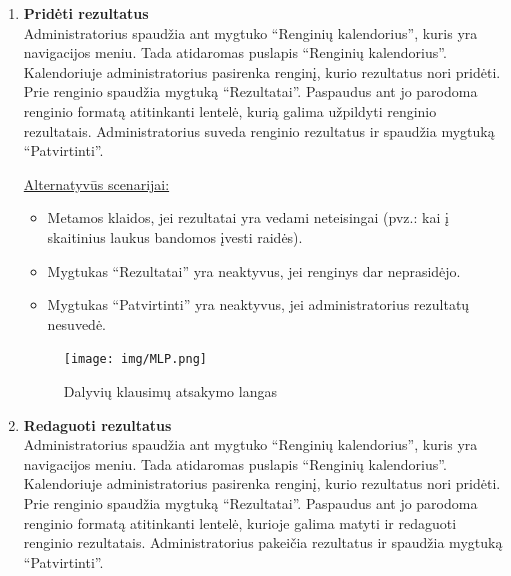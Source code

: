 \documentclass{VUMIFPSkursinis}
\begin{document}
\begin{enumerate} [label = \textbf{U\arabic*.}]
					\underline{Alternatyvūs scenarijai:}
					\begin{itemize}
						\item Jei administratorius atsiradus dialogui atšaukia ištrinimą, dialogas pašalinamas ir parodomas renginio puslapis.
					\end{itemize}
				
				\begin{figure}[H]
					\centering
					\texttt{[image: img/MLP.png]}
					\caption{Dalyvių klausimų atsakymo langas}
					\label{fig:atsakyti-klausimus}
				\end{figure}
				
			\item \textbf{Pridėti rezultatus}   \\
					Administratorius spaudžia ant mygtuko “Renginių kalendorius”, kuris yra navigacijos meniu. Tada atidaromas puslapis “Renginių kalendorius”. Kalendoriuje administratorius pasirenka renginį, kurio rezultatus nori pridėti. Prie renginio spaudžia mygtuką “Rezultatai”. Paspaudus ant jo parodoma renginio formatą atitinkanti lentelė, kurią galima užpildyti renginio rezultatais. Administratorius suveda renginio rezultatus ir spaudžia mygtuką “Patvirtinti”.
					
					\underline{Alternatyvūs scenarijai:}
					\begin{itemize}
						\item Metamos klaidos, jei rezultatai yra vedami neteisingai (pvz.: kai į skaitinius laukus bandomos įvesti raidės).
						\item Mygtukas “Rezultatai” yra neaktyvus, jei renginys dar neprasidėjo.
						\item Mygtukas “Patvirtinti” yra neaktyvus, jei administratorius rezultatų nesuvedė.
					\end{itemize}
				
				\begin{figure}[H]
					\centering
					\texttt{[image: img/MLP.png]}
					\caption{Dalyvių klausimų atsakymo langas}
					\label{fig:atsakyti-klausimus}
				\end{figure}
					
			\item \textbf{Redaguoti rezultatus}   \\
					Administratorius spaudžia ant mygtuko “Renginių kalendorius”, kuris yra navigacijos meniu. Tada atidaromas puslapis “Renginių kalendorius”. Kalendoriuje administratorius pasirenka renginį, kurio rezultatus nori pridėti. Prie renginio spaudžia mygtuką “Rezultatai”. Paspaudus ant jo parodoma renginio formatą atitinkanti lentelė, kurioje galima matyti ir redaguoti renginio rezultatais. Administratorius pakeičia rezultatus ir spaudžia mygtuką “Patvirtinti”.
					

\end{enumerate}
\end{document}
